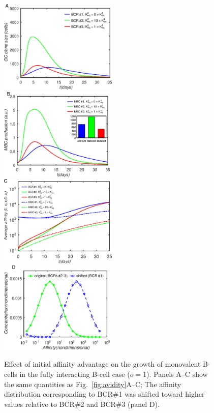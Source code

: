 \documentclass[utf8]{frontiersHLTH}%
\newcommand{\fig}[1]{Fig.~\ref{fig:#1}}
\newcommand{\hfig}[1]{#1} %
\begin{document}
\hfig{
\begin{figure}
\centering
\includegraphics[width=0.5\textwidth]{../fig5/gcsize.eps}
\includegraphics[width=0.49\textwidth]{../fig5/dmbc.eps}
\includegraphics[width=0.5\textwidth]{../fig5/A.eps}
\includegraphics[width=0.49\textwidth]{../fig5/dist.eps}
\caption{Effect of initial affinity advantage on the growth of monovalent B-cells in the fully interacting B-cell case ($o=1$).
Panels A--C show the same quantities as \fig{avidity}A--C;
The affinity distribution corresponding to BCR\#1 was shifted toward higher values relative to BCR\#2 and BCR\#3
(panel D).
}
\label{fig:kadv}
\end{figure}
}
\end{document}
